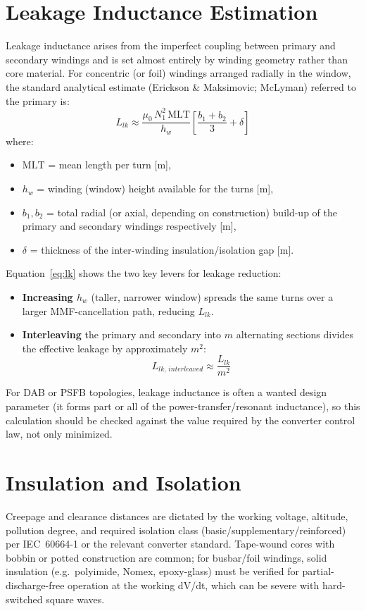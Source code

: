 \documentclass[11pt,a4paper]{article}
\begin{document}
\section{Leakage Inductance Estimation}
Leakage inductance arises from the imperfect coupling between primary and
secondary windings and is set almost entirely by winding geometry rather than
core material. For concentric (or foil) windings arranged radially in the
window, the standard analytical estimate (Erickson \& Maksimovic;
McLyman)\cite{erickson,mclyman} referred to the primary is:
\begin{equation}
    L_{lk} \approx \frac{\mu_0 \, N_1^2 \, \mathrm{MLT}}{h_w}
    \left[ \frac{b_1+b_2}{3} + \delta \right]
    \label{eq:lk}
\end{equation}
where:
\begin{itemize}
    \item $\mathrm{MLT}$ = mean length per turn [m],
    \item $h_w$ = winding (window) height available for the turns [m],
    \item $b_1, b_2$ = total radial (or axial, depending on construction)
    build-up of the primary and secondary windings respectively [m],
    \item $\delta$ = thickness of the inter-winding insulation/isolation gap [m].
\end{itemize}
Equation~\eqref{eq:lk} shows the two key levers for leakage reduction:
\begin{itemize}
    \item \textbf{Increasing $h_w$} (taller, narrower window) spreads the same
    turns over a larger MMF-cancellation path, reducing $L_{lk}$.
    \item \textbf{Interleaving} the primary and secondary into $m$ alternating
    sections divides the effective leakage by approximately $m^2$:
    \begin{equation}
        L_{lk,\,interleaved} \approx \frac{L_{lk}}{m^2}
    \end{equation}
\end{itemize}
For DAB or PSFB topologies, leakage inductance is often a wanted design
parameter (it forms part or all of the power-transfer/resonant inductance), so
this calculation should be checked against the value required by the converter
control law, not only minimized.

\section{Insulation and Isolation}
Creepage and clearance distances are dictated by the working voltage, altitude,
pollution degree, and required isolation class (basic/supplementary/reinforced)
per IEC~60664-1 or the relevant converter standard. Tape-wound cores with bobbin
or potted construction are common; for busbar/foil windings, solid insulation
(e.g.\ polyimide, Nomex, epoxy-glass) must be verified for partial-discharge-free
operation at the working dV/dt, which can be severe with hard-switched square waves.
\end{document}
